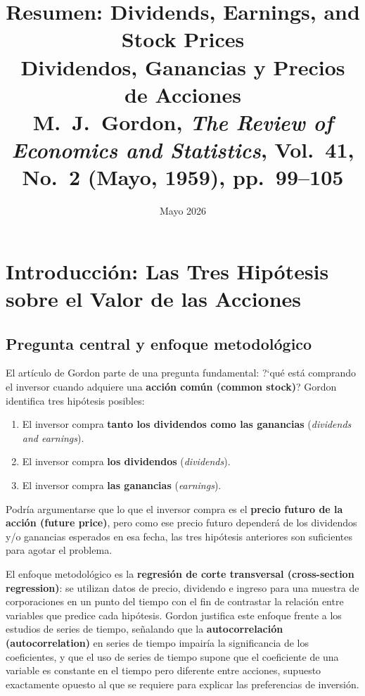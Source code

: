 \documentclass[12pt]{article}
\title{\textbf{Resumen: Dividends, Earnings, and Stock Prices}\\
\large Dividendos, Ganancias y Precios de Acciones\\
\normalsize M.~J.~Gordon, \textit{The Review of Economics and Statistics},
Vol.~41, No.~2 (Mayo, 1959), pp.~99--105}
\author{}
\date{Mayo 2026}
\begin{document}
\maketitle
\tableofcontents
\newpage

\section{Introducci\'on: Las Tres Hip\'otesis sobre el Valor de las Acciones}

\subsection{Pregunta central y enfoque metodol\'ogico}

El art\'iculo de Gordon parte de una pregunta fundamental: ?`qu\'e est\'a comprando el inversor cuando adquiere una \textbf{acci\'on com\'un (common stock)}? Gordon identifica tres hip\'otesis posibles:

\begin{enumerate}
  \item El inversor compra \textbf{tanto los dividendos como las ganancias} (\textit{dividends and earnings}).
  \item El inversor compra \textbf{los dividendos} (\textit{dividends}).
  \item El inversor compra \textbf{las ganancias} (\textit{earnings}).
\end{enumerate}

Podría argumentarse que lo que el inversor compra es el \textbf{precio futuro de la acci\'on (future price)}, pero como ese precio futuro depender\'a de los dividendos y/o ganancias esperados en esa fecha, las tres hip\'otesis anteriores son suficientes para agotar el problema.

El enfoque metodol\'ogico es la \textbf{regresi\'on de corte transversal (cross-section regression)}: se utilizan datos de precio, dividendo e ingreso para una muestra de corporaciones en un punto del tiempo con el fin de contrastar la relaci\'on entre variables que predice cada hip\'otesis. Gordon justifica este enfoque frente a los estudios de series de tiempo, se\~nalando que la \textbf{autocorrelaci\'on (autocorrelation)} en series de tiempo impair\'ia la significancia de los coeficientes, y que el uso de series de tiempo supone que el coeficiente de una variable es constante en el tiempo pero diferente entre acciones, supuesto exactamente opuesto al que se requiere para explicar las preferencias de inversi\'on.
\end{document}
